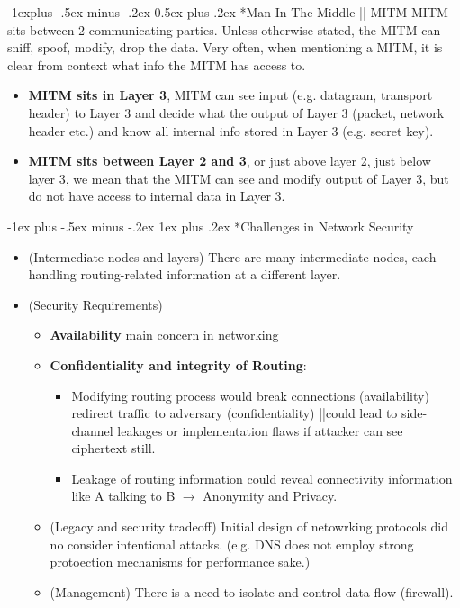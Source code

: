 \documentclass[10pt,landscape]{article}
\makeatletter
\renewcommand{\subsection}{\@startsection{subsection}{2}{0mm}%
                                {-1explus -.5ex minus -.2ex}%
                                {0.5ex plus .2ex}%
                                {\normalfont\normalsize\bfseries}}
\renewcommand{\subsubsection}{\@startsection{subsubsection}{3}{0mm}%
                                {-1ex plus -.5ex minus -.2ex}%
                                {1ex plus .2ex}%
                                {\normalfont\small\bfseries}}
\makeatother
\begin{document}
\begin{multicols*}{3}
\subsection*{Man-In-The-Middle || MITM}
MITM sits between 2 communicating parties. Unless otherwise stated, the MITM can sniff, spoof,
modify, drop the data. Very often, when mentioning a MITM, it is clear from context what info the MITM has access to. 
\begin{itemize}[noitemsep,wide=0pt, leftmargin=\dimexpr{} + 2\relax]
    \item \textbf{MITM sits in Layer 3}, MITM can see input (e.g. datagram, transport header) to Layer 3 and decide what the output of Layer 3 (packet, network header etc.) and know all internal info stored in Layer 3 (e.g. secret key).
    \item \textbf{MITM sits between Layer 2 and 3}, or just above layer 2, just below layer 3, we mean that the MITM can see and modify output of Layer 3, but do not have access to internal data in Layer 3.
\end{itemize}

\subsubsection*{Challenges in Network Security}
\begin{itemize}[noitemsep,wide=0pt, leftmargin=\dimexpr{} + 2\relax]
    \item (Intermediate nodes and layers) There are many intermediate nodes, each handling routing-related information at a different layer. 
    \item (Security Requirements)
    \begin{itemize}[noitemsep,wide=0pt, leftmargin=\dimexpr{} + 2\relax]
        \item \textbf{Availability} main concern in networking
        \item \textbf{Confidentiality and integrity of Routing}:
        \begin{itemize}[noitemsep,wide=0pt, leftmargin=\dimexpr{} + 2\relax]
            \item Modifying routing process would break connections (availability) redirect traffic to adversary (confidentiality) ||could lead to side-channel leakages or implementation flaws if attacker can see ciphertext still.
            \item Leakage of routing information could reveal connectivity information like A talking to B $\rightarrow$ Anonymity and Privacy.
        \end{itemize}
        \item (Legacy and security tradeoff) Initial design of netowrking protocols did no consider intentional attacks. (e.g. DNS does not employ strong protoection mechanisms for performance sake.)
        \item (Management) There is a need to isolate and control data flow (firewall).
    \end{itemize}
\end{itemize}


\end{multicols*}
\end{document}
